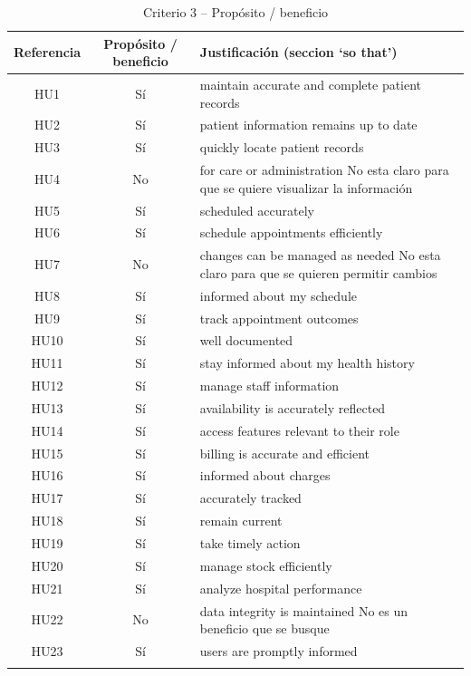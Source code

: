 \begin{longtable}{|c|c|p{6cm}|}
\hline
\textbf{Referencia} & \textbf{Propósito / beneficio} & \textbf{Justificación (seccion `so that')} \\
\hline
HU1 & Sí & maintain accurate and complete patient records \\
\hline
HU2 & Sí & patient information remains up to date \\
\hline
HU3 & Sí & quickly locate patient records \\
\hline
HU4 & No & for care or administration \newline
No esta claro para que se quiere visualizar la información \\
\hline
HU5 & Sí & scheduled accurately \\
\hline
HU6 & Sí & schedule appointments efficiently \\
\hline
HU7 & No & changes can be managed as needed \newline
No esta claro para que se quieren permitir cambios\\
\hline
HU8 & Sí & informed about my schedule \\
\hline
HU9 & Sí & track appointment outcomes \\
\hline
HU10 & Sí & well documented \\
\hline
HU11 & Sí & stay informed about my health history \\
\hline
HU12 & Sí & manage staff information \\
\hline
HU13 & Sí & availability is accurately reflected \\
\hline
HU14 & Sí & access features relevant to their role \\
\hline
HU15 & Sí & billing is accurate and efficient \\
\hline
HU16 & Sí & informed about charges \\
\hline
HU17 & Sí &  accurately tracked \\
\hline
HU18 & Sí & remain current \\
\hline
HU19 & Sí & take timely action \\
\hline
HU20 & Sí & manage stock efficiently \\
\hline
HU21 & Sí & analyze hospital performance \\
\hline
HU22 & No & data integrity is maintained \newline No es un beneficio que se busque \\
\hline
HU23 & Sí & users are promptly informed \\
\hline
\caption{Criterio 3 – Propósito / beneficio}
\end{longtable}

